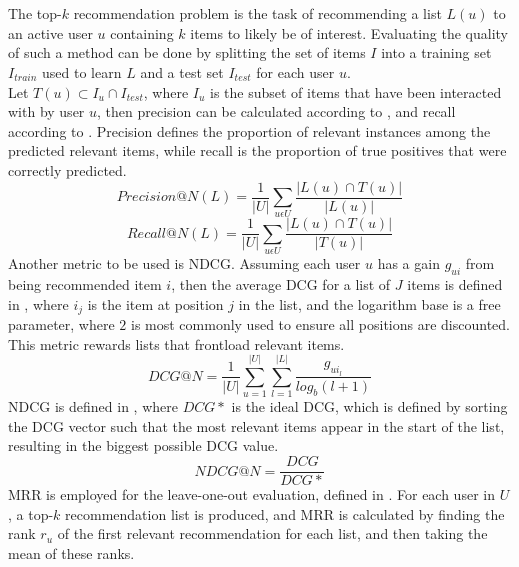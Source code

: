 \\\\
The top-$k$ recommendation problem is the task of recommending a list $L(u)$ to an active user $u$ containing $k$ items to likely be of interest.
Evaluating the quality of such a method can be done by splitting the set of items $I$ into a training set $I_{train}$ used to learn $L$ and a test set $I_{test}$ for each user $u$.
\\
Let $T(u) \subset I_u \cap I_{test}$, where $I_u$ is the subset of items that have been interacted with by user $u$, then precision can be calculated according to , and recall according to .
Precision defines the proportion of relevant instances among the predicted relevant items, while recall is the proportion of true positives that were correctly predicted.
\begin{equation}
    \label{eqn:precision}
    Precision@N(L) = \frac{1}{|U|} \sum\limits_{u \epsilon U}\frac{|L(u) \cap T(u)|}{|L(u)|}
\end{equation}
\begin{equation}
    \label{eqn:recall}
    Recall@N(L) = \frac{1}{|U|} \sum\limits_{u \epsilon U} \frac{|L(u) \cap T(u)|}{|T(u)|}
\end{equation}
Another metric to be used is NDCG\cite{dcgpaper}.
Assuming each user $u$ has a gain $g_{ui}$ from being recommended item $i$, then the average DCG for a list of $J$ items is defined in , where $i_j$ is the item at position $j$ in the list, and the logarithm base is a free parameter, where $2$ is most commonly used to ensure all positions are discounted.
This metric rewards lists that frontload relevant items.
\begin{equation}
    \label{eqn:dcg}
    DCG@N = \frac{1}{|U|} \sum\limits_{u=1}^{|U|} \sum\limits_{l = 1}^{|L|} \frac{g_{ui_l}}{log_b (l+1)}
\end{equation}
NDCG is defined in , where $DCG*$ is the ideal DCG, which is defined by sorting the DCG vector such that the most relevant items appear in the start of the list, resulting in the biggest possible DCG value.
\begin{equation}
    \label{eqn:ndcg}
    NDCG@N = \frac{DCG}{DCG*}
\end{equation}
MRR\cite{MRR} is employed for the leave-one-out evaluation, defined in .
For each user in $U$, a top-$k$ recommendation list is produced, and MRR is calculated by finding the rank $r_u$ of the first relevant recommendation for each list, and then taking the mean of these ranks.
